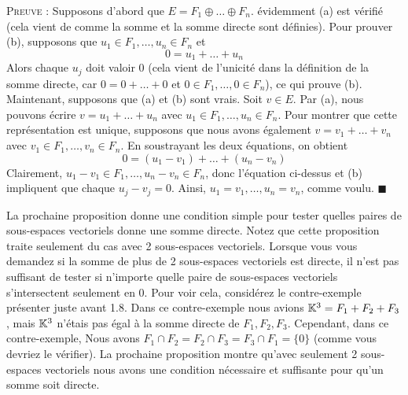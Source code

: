 \documentclass[12pt]{book}
\theoremstyle{plain}
\begin{document}
\textsc{Preuve :} Supposons d'abord que $E=F_1\oplus\ldots\oplus F_n$. évidemment (a) est vérifié (cela vient de comme la somme et la somme directe sont définies). Pour prouver (b), supposons que $u_1\in F_1,\ldots,u_n\in F_n$ et
\begin{equation*}
    0=u_1+\ldots+u_n
\end{equation*}
Alors chaque $u_j$ doit valoir 0 (cela vient de l'unicité dans la définition de la somme directe, car $0=0+\ldots+0$ et $0\in F_1,\ldots,0\in F_n$), ce qui prouve (b).\\
\indent
Maintenant, supposons que (a) et (b) sont vrais. Soit $v\in E$. Par (a), nous pouvons écrire $v=u_1+\ldots+u_n$ avec $u_1\in F_1,\ldots,u_n\in F_n$. Pour montrer que cette représentation est unique, supposons que nous avons également $v=v_1+\ldots+v_n$ avec $v_1\in F_1,\ldots,v_n\in F_n$. En soustrayant les deux équations, on obtient
\begin{equation*}
    0=(u_1-v_1)+\ldots+(u_n-v_n)
\end{equation*}
\indent Clairement, $u_1-v_1\in F_1,\ldots,u_n-v_n\in F_n$, donc l'équation ci-dessus et (b) impliquent que chaque $u_j-v_j=0$. Ainsi, $u_1=v_1,\ldots,u_n=v_n$, comme voulu. \hfill$\blacksquare$

La prochaine proposition donne une condition simple pour tester quelles paires de sous-espaces vectoriels donne une somme directe. Notez que cette proposition traite seulement du cas avec 2 sous-espaces vectoriels. Lorsque vous vous demandez si la somme de plus de 2 sous-espaces vectoriels est directe, il n'est pas suffisant de tester si n'importe quelle paire de sous-espaces vectoriels s'intersectent seulement en 0. Pour voir cela, considérez le contre-exemple présenter juste avant 1.8. Dans ce contre-exemple nous avions $\mathbb{K}^3=F_1+F_2+F_3$, mais $\mathbb{K}^3$ n'étais pas égal à la somme directe de $F_1,F_2,F_3$. Cependant, dans ce contre-exemple, Nous avons $F_1 \cap F_2=F_2 \cap F_3=F_3 \cap F_1=\{0\}$ (comme vous devriez le vérifier). La prochaine proposition montre qu'avec seulement 2 sous-espaces vectoriels nous avons une condition nécessaire et suffisante pour qu'un somme soit directe.
\end{document}
